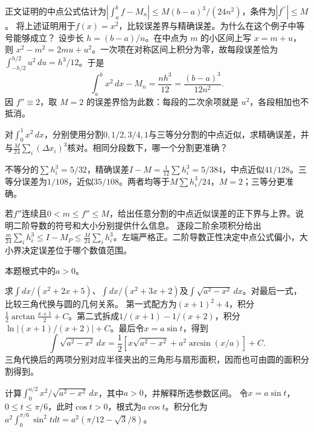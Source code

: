 正文证明的中点公式估计为\(\left|\int_a^bf-M_n\right|\le M(b-a)^3/(24n^2)\)，条件为\(|f^{\prime\prime}|\le M\)。
将上述证明用于\(f(x)=x^2\)，比较误差界与精确误差。为什么在这个例子中等号能够成立？
\solutionanswer
设步长 \(h=(b-a)/n\)。在中点为 \(m\) 的小区间上写 \(x=m+u\)，则 \(x^2-m^2=2mu+u^2\)。一次项在对称区间上积分为零，故每段误差恰为 \(\int_{-h/2}^{h/2}u^2\,du=h^3/12\)。于是
\[
 \int_a^b x^2\,dx-M_n=\frac{nh^3}{12}=\frac{(b-a)^3}{12n^2}.
\]
因 \(f''\equiv2\)，取 \(M=2\) 的误差界恰为此数：每段的二次余项就是 \(u^2\)，各段相加也不抵消。


对\(\int_0^1x^2\,dx\)，分别使用分割\(0,1/2,3/4,1\)与三等分分割的中点近似，求精确误差，并与\(\frac M{24}\sum_i(\Delta x_i)^3\)核对。相同分段数下，哪一个分割更准确？
\par
\solutionanswer
不等分的\(\sum h_i^3=5/32\)，精确误差\(I-M=\frac1{12}\sum h_i^3=5/384\)，中点近似\(41/128\)。三等分误差为\(1/108\)，近似\(35/108\)。两者均等于\(M\sum h_i^3/24\)，\(M=2\)；三等分更准确。


若\(f''\)连续且\(0<m\le f''\le M\)，给出任意分割的中点近似误差的正下界与上界。说明二阶导数的符号和大小分别提供什么信息。
\solutionanswer
逐段二阶余项积分给出\(\frac m{24}\sum_i h_i^3\le I-M_P\le\frac M{24}\sum_i h_i^3\)。左端严格正。二阶导数正性决定中点公式偏小，大小界决定误差位于哪个数值范围。


本题根式中的\(a>0\)。

求\(\int dx/(x^2+2x+5)\)、\(\int dx/(x^2+3x+2)\)及\(\int\sqrt{a^2-x^2}\,dx\)。对最后一式，比较三角代换与圆的几何关系。
\solutionanswer
第一式配方为\((x+1)^2+4\)，积分\(\frac12\arctan\frac{x+1}2+C\)。第二式拆成\(1/(x+1)-1/(x+2)\)，积分\(\ln|(x+1)/(x+2)|+C\)。最后令\(x=a\sin t\)，得到
\[
 \int\sqrt{a^2-x^2}\,dx=\frac12\left[x\sqrt{a^2-x^2}+a^2\arcsin(x/a)\right]+C.
\]
三角代换后的两项分别对应半径夹出的三角形与扇形面积，因而也可由圆的面积分割得到。


计算\(\int_0^{a/2} x^2/\sqrt{a^2-x^2}\,dx\)，其中\(a>0\)，并解释所选参数区间。
\solutionanswer
令\(x=a\sin t\)，\(0\le t\le\pi/6\)，此时\(\cos t>0\)，根式为\(a\cos t\)。积分化为\(a^2\int_0^{\pi/6}\sin^2t dt=a^2(\pi/12-\sqrt3/8)\)。


